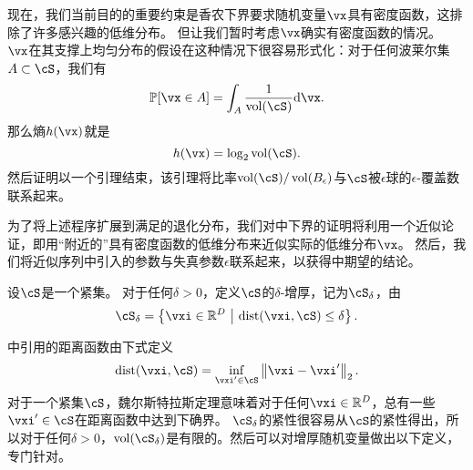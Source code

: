 \documentclass[../../book-main_zh.tex]{subfiles}
\begin{document}
现在，我们当前目的的重要约束是香农下界要求随机变量$\vx$具有密度函数，这排除了许多感兴趣的低维分布。
但让我们暂时考虑$\vx$确实有密度函数的情况。
$\vx$在其支撑上均匀分布的假设在这种情况下很容易形式化：对于任何波莱尔集$A \subset \cS$，我们有
\begin{equation}
    \Pr[\vx \in A] = \int_{A} \frac{1}{\volume(\cS)} \odif \vx.
\end{equation}
那么熵$h(\vx)$就是
\begin{equation}
    h(\vx) = \log_2 \volume(\cS).
\end{equation}
然后证明以一个引理结束，该引理将比率$\volume(\cS) / \volume(B_{\epsilon})$与$\cS$被$\epsilon$球的$\epsilon$-覆盖数联系起来。


为了将上述程序扩展到满足的退化分布，我们对中下界的证明将利用一个近似论证，即用“附近的”具有密度函数的低维分布来近似实际的低维分布$\vx$。
然后，我们将近似序列中引入的参数与失真参数$\epsilon$联系起来，以获得中期望的结论。


\begin{definition}\label{def:thickening-set}
    设$\cS$是一个紧集。
    对于任何$\delta > 0$，定义$\cS$的$\delta$-增厚，记为$\cS_{\delta}$，由
    \begin{equation}
        \cS_{\delta} = \set*{\vxi \in \R^D \given \mathrm{dist}(\vxi, \cS) \leq
        \delta}.
    \end{equation}
\end{definition}
中引用的距离函数由下式定义
\begin{equation}\label{eq:dist-func}
    \dist(\vxi, \cS) = \inf_{\vxi' \in \cS} \norm*{\vxi - \vxi'}_2.
\end{equation}
对于一个紧集$\cS$，魏尔斯特拉斯定理意味着对于任何$\vxi \in \R^D$，总有一些$\vxi' \in \cS$在距离函数中达到下确界。
$\cS_{\delta}$的紧性很容易从$\cS$的紧性得出，所以对于任何$\delta > 0$，$\volume(\cS_{\delta})$是有限的。然后可以对增厚随机变量做出以下定义，专门针对。

\end{document}
